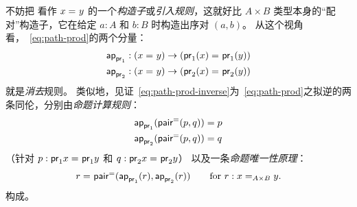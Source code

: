 不妨把 \pairpath 看作 $\id x y$ 的一个\emph{构造子}或\emph{引入规则}，这就好比 $A\times B$ 类型本身的``配对''构造子，它在给定 $a:A$ 和 $b:B$ 时构造出序对 $(a,b)$。
从这个视角看，~\eqref{eq:path-prod}的两个分量：
\begin{align*}
  \projpath{1} &: (\id{x}{y}) \to (\id{\proj{1}(x)}{\proj{1} (y)})\\
  \projpath{2} &: (\id{x}{y}) \to (\id{\proj{2}(x)}{\proj{2} (y)})
\end{align*}
就是\emph{消去}规则。
类似地，见证~\eqref{eq:path-prod-inverse}为~\eqref{eq:path-prod}之拟逆的两条同伦，分别由\emph{命题计算规则}：
%
\begin{align*}
  {\projpath{1}{(\pairpath(p, q)})}
  &= %
  {p} \\
  {\projpath{2}{(\pairpath(p,q)})}
  &= %
  {q}
\end{align*}
（针对 $p:\id{\proj{1} x}{\proj{1} y}$ 和 $q:\id{\proj{2} x}{\proj{2} y}$）
以及一条\emph{命题唯一性原理}：
%
\[
\id{r}{\pairpath(\projpath{1} (r), \projpath{2} (r)) }
\qquad\text{for } r : \id[A \times B] x y.
\]
构成。

